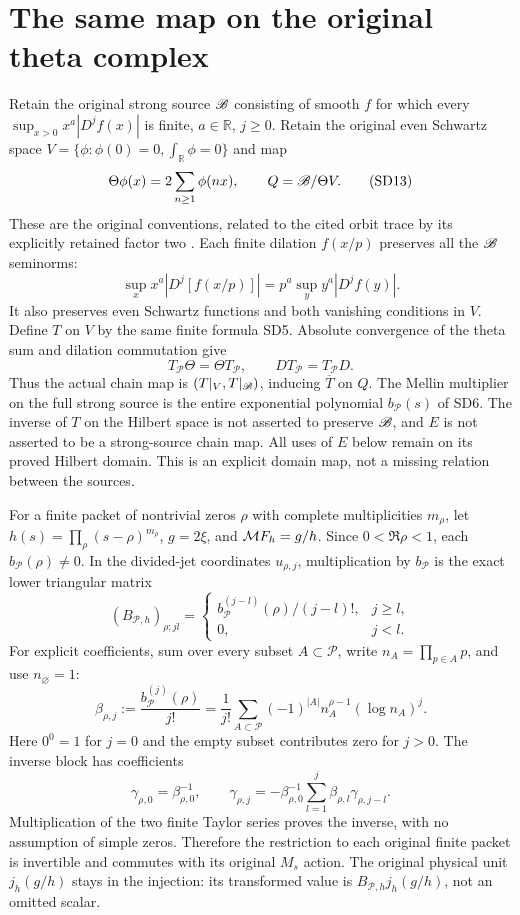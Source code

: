 \documentclass[11pt]{article}
\begin{document}
\section{The same map on the original theta complex}
Retain the original strong source $\mathscr B$ consisting of smooth $f$ for
which every $\sup_{x>0}x^a|D^jf(x)|$ is finite, $a\in\mathbb R$,
$j\ge0$. Retain the original even Schwartz space
$V=\{\phi:\phi(0)=0,\int_\mathbb R\phi=0\}$ and map
\[
 \Theta\phi(x)=2\sum_{n\ge1}\phi(nx),\qquad Q=\mathscr B/\Theta V.
                                                               \tag{SD13}
\]
These are the original conventions, related to the cited orbit trace
by its explicitly retained factor two \cite{swdual:CCtrace,swdual:Meyer}.
Each finite dilation $f(x/p)$ preserves all the $\mathscr B$ seminorms:
\[
 \sup_x x^a|D^j[f(x/p)]|=p^a\sup_y y^a|D^jf(y)|.
\]
It also preserves even Schwartz functions and both vanishing
conditions in $V$. Define $T$ on $V$ by the same finite formula SD5.
Absolute convergence of the theta sum and dilation commutation give
\[
 T_{\mathcal P}\Theta=\Theta T_{\mathcal P},\qquad
 DT_{\mathcal P}=T_{\mathcal P}D.                             \tag{SD14}
\]
Thus the actual chain map is $(T|_V,T|_\mathscr B)$, inducing $\overline T$
on $Q$. The Mellin multiplier on the full strong source is the
entire exponential polynomial $b_{\mathcal P}(s)$ of SD6.
The inverse of $T$ on the Hilbert space is not asserted to preserve
$\mathscr B$, and $E$ is not asserted to be a strong-source chain map.
All uses of $E$ below remain on its proved Hilbert domain. This is
an explicit domain map, not a missing relation between the sources.

For a finite packet of nontrivial zeros $\rho$ with complete
multiplicities $m_\rho$, let $h(s)=\prod_\rho(s-\rho)^{m_\rho}$,
$g=2\xi$, and $\mathcal M F_h=g/h$. Since $0<\Re\rho<1$,
each $b_{\mathcal P}(\rho)\ne0$. In the divided-jet coordinates
$u_{\rho,j}$, multiplication by $b_{\mathcal P}$ is the exact
lower triangular matrix
\[
 (B_{\mathcal P,h})_{\rho;jl}=
 \begin{cases} b_{\mathcal P}^{(j-l)}(\rho)/(j-l)!,&j\ge l,\\
 0,&j<l.\end{cases}                                          \tag{SD15}
\]
For explicit coefficients, sum over every subset $A\subset\mathcal P$,
write $n_A=\prod_{p\in A}p$, and use $n_\varnothing=1$:
\[
 \beta_{\rho,j}:=\frac{b_{\mathcal P}^{(j)}(\rho)}{j!}
 =\frac1{j!}\sum_{A\subset\mathcal P}(-1)^{|A|}
          n_A^{\rho-1}(\log n_A)^j.                           \tag{SD16}
\]
Here $0^0=1$ for $j=0$ and the empty subset contributes zero for
$j>0$. The inverse block has coefficients
\[
 \gamma_{\rho,0}=\beta_{\rho,0}^{-1},\qquad
 \gamma_{\rho,j}=-\beta_{\rho,0}^{-1}
               \sum_{l=1}^j\beta_{\rho,l}\gamma_{\rho,j-l}.
                                                               \tag{SD17}
\]
Multiplication of the two finite Taylor series proves the inverse,
with no assumption of simple zeros. Therefore the restriction to
each original finite packet is invertible and commutes with its
original $M_s$ action. The original physical unit $j_h(g/h)$ stays
in the injection: its transformed value is
$B_{\mathcal P,h}j_h(g/h)$, not an omitted scalar.
\end{document}
